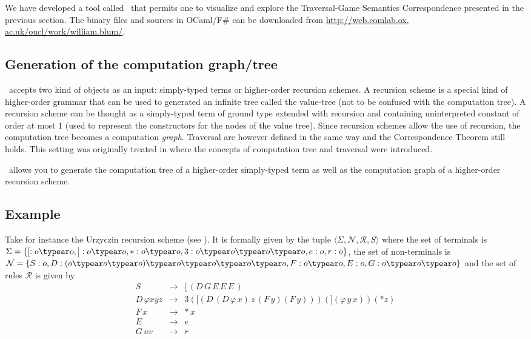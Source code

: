 We have developed a tool called \toolname\ that permits one to visualize and explore the Traversal-Game Semantics Correspondence presented in the previous section. The binary files and sources in OCaml/F\# can be downloaded from \url{http://web.comlab.ox. ac.uk/oucl/work/william.blum/}.

\subsection{Generation of the computation graph/tree}

\toolname\ accepts two kind of objects as an input: simply-typed terms or higher-order recursion schemes. A recursion scheme is a special kind of higher-order grammar that can be used to generated an infinite tree called the value-tree (not to be confused with the computation tree). A recursion scheme can be thought as a simply-typed term of ground type extended with recursion and containing uninterpreted constant of order at most 1 (used to represent the constructors for the nodes of the value tree). Since recursion schemes allow the use of recursion, the computation tree becomes a computation \emph{graph}. Traversal are however defined in the same way and the Correspondence Theorem still holds. This setting was originally treated in \cite{OngLics2006} where the concepts of computation tree and traversal were introduced.


\toolname\ allows you to generate the computation tree of a higher-order simply-typed term as well as the computation graph of a higher-order recursion scheme.

\subsection{Example}

Take for instance the Urzyczin recursion scheme (see \cite{demirandathesis}). It is formally given by the tuple $\langle \Sigma, \mathcal{N}, \mathcal{R}, S \rangle $ where the set of terminals is $\Sigma = \{[:o\typear o,
    ]:o \typear o,*:o \typear o, 3:o \typear o \typear o \typear o, e:o,
    r:o\}$, the set of non-terminals is
 $\mathcal{N} = \{ S:o,
    D:(o \typear o \typear o) \typear o \typear o \typear o \typear
    o,
    F:o \typear o,
    E:o,
    G:o \typear o \typear o \}$ and the set of rules $\mathcal{R}$ is given by
\[\begin{array}{rll}
   S\, & \rightarrow & [\, (D\, G\, E\, E\, E\,) \\
    D\, \varphi x y z & \rightarrow & 3 ([ (D\, (D\, \varphi\, x)\, z\, (F\, y) (F\, y))) (] (\varphi\, y\, x)) (* z) \\
    F\, x & \rightarrow & *\, x \\
    E\, & \rightarrow & e \\
    G\, u v & \rightarrow & r
\end{array}\]


